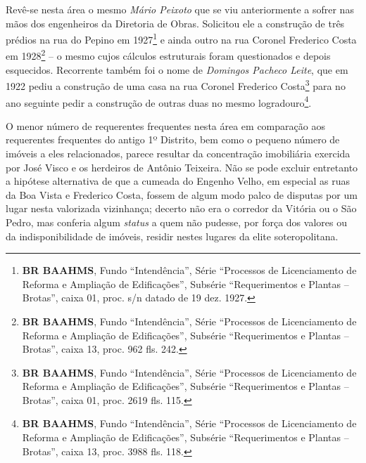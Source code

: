 Revê-se nesta área o mesmo \textit{Mário Peixoto} que se viu anteriormente a sofrer nas mãos dos engenheiros da Diretoria de Obras. Solicitou ele a construção de três prédios na rua do Pepino em 1927\footnote{\textbf{BR BAAHMS}, Fundo ``Intendência'', Série ``Processos de Licenciamento de Reforma e Ampliação de Edificações'', Subsérie ``Requerimentos e Plantas -- Brotas'', caixa 01, proc. s/n datado de 19 dez. 1927.} e ainda outro na rua Coronel Frederico Costa em 1928\footnote{\textbf{BR BAAHMS}, Fundo ``Intendência'', Série ``Processos de Licenciamento de Reforma e Ampliação de Edificações'', Subsérie ``Requerimentos e Plantas -- Brotas'', caixa 13, proc. 962 fls. 242.} -- o mesmo cujos cálculos estruturais foram questionados e depois esquecidos. Recorrente também foi o nome de \textit{Domingos Pacheco Leite}, que em 1922 pediu a construção de uma casa na rua Coronel Frederico Costa\footnote{\textbf{BR BAAHMS}, Fundo ``Intendência'', Série ``Processos de Licenciamento de Reforma e Ampliação de Edificações'', Subsérie ``Requerimentos e Plantas -- Brotas'', caixa 01, proc. 2619 fls. 115.} para no ano seguinte pedir a construção de outras duas no mesmo logradouro\footnote{\textbf{BR BAAHMS}, Fundo ``Intendência'', Série ``Processos de Licenciamento de Reforma e Ampliação de Edificações'', Subsérie ``Requerimentos e Plantas -- Brotas'', caixa 13, proc. 3988 fls. 118.}.

O menor número de requerentes frequentes nesta área em comparação aos requerentes frequentes do antigo 1º Distrito, bem como o pequeno número de imóveis a eles relacionados, parece resultar da concentração imobiliária exercida por José Visco e os herdeiros de Antônio Teixeira. Não se pode excluir entretanto a hipótese alternativa de que a cumeada do Engenho Velho, em especial as ruas da Boa Vista e Frederico Costa, fossem de algum modo palco de disputas por um lugar nesta valorizada vizinhança; decerto não era o corredor da Vitória ou o São Pedro, mas conferia algum \textit{status} a quem não pudesse, por força dos valores ou da indisponibilidade de imóveis, residir nestes lugares da elite soteropolitana. 


